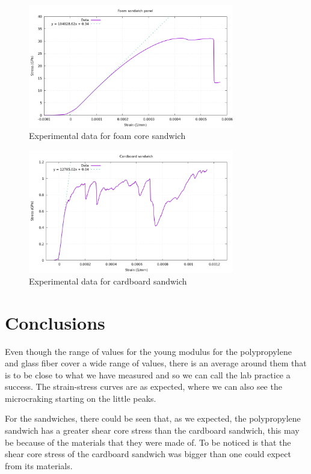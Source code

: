 \begin{figure}[h]
	\centering
	\includegraphics[width=0.8\textwidth]{img/foam_sandwich.png}
	\caption{Experimental data for foam core sandwich}
\end{figure}

\begin{figure}[h]
	\centering
	\includegraphics[width=0.8\textwidth]{img/cardboard_sandwich.png}
	\caption{Experimental data for cardboard sandwich}
\end{figure}


\clearpage
\section{Conclusions}

Even though the range of values for the young modulus for the polypropylene and glass fiber cover a wide range of values, there is an average around them
that is to be close to what we have measured and so we can call the lab practice a success. The strain-stress curves are as expected, where we can also see
the microcraking starting on the little peaks.

For the sandwiches, there could be seen that, as we expected, the polypropylene sandwich has a greater shear core stress than the cardboard sandwich,
this may be because of the materials that they were made of. To be noticed is that the shear core stress of the cardboard sandwich was bigger than one
could expect from its materials.
